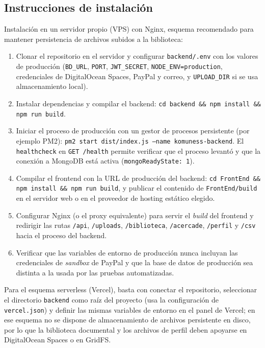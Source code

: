 \subsection{Instrucciones de instalación}
Instalación en un servidor propio (VPS) con Nginx, esquema recomendado para mantener persistencia de archivos subidos a la biblioteca:
\begin{enumerate}
    \item Clonar el repositorio en el servidor y configurar \texttt{backend/.env} con los valores de producción (\texttt{BD\_URL}, \texttt{PORT}, \texttt{JWT\_SECRET}, \texttt{NODE\_ENV=production}, credenciales de DigitalOcean Spaces, PayPal y correo, y \texttt{UPLOAD\_DIR} si se usa almacenamiento local).
    \item Instalar dependencias y compilar el backend: \texttt{cd backend \&\& npm install \&\& npm run build}.
    \item Iniciar el proceso de producción con un gestor de procesos persistente (por ejemplo PM2): \texttt{pm2 start dist/index.js --name komuness-backend}. El \texttt{healthcheck} en \texttt{GET /health} permite verificar que el proceso levantó y que la conexión a MongoDB está activa (\texttt{mongoReadyState: 1}).
    \item Compilar el frontend con la URL de producción del backend: \texttt{cd FrontEnd \&\& npm install \&\& npm run build}, y publicar el contenido de \texttt{FrontEnd/build} en el servidor web o en el proveedor de hosting estático elegido.
    \item Configurar Nginx (o el proxy equivalente) para servir el \textit{build} del frontend y redirigir las rutas \texttt{/api}, \texttt{/uploads}, \texttt{/biblioteca}, \texttt{/acercade}, \texttt{/perfil} y \texttt{/csv} hacia el proceso del backend.
    \item Verificar que las variables de entorno de producción nunca incluyan las credenciales de \textit{sandbox} de PayPal y que la base de datos de producción sea distinta a la usada por las pruebas automatizadas.
\end{enumerate}
Para el esquema serverless (Vercel), basta con conectar el repositorio, seleccionar el directorio \texttt{backend} como raíz del proyecto (usa la configuración de \texttt{vercel.json}) y definir las mismas variables de entorno en el panel de Vercel; en ese esquema no se dispone de almacenamiento de archivos persistente en disco, por lo que la biblioteca documental y los archivos de perfil deben apoyarse en DigitalOcean Spaces o en GridFS.
